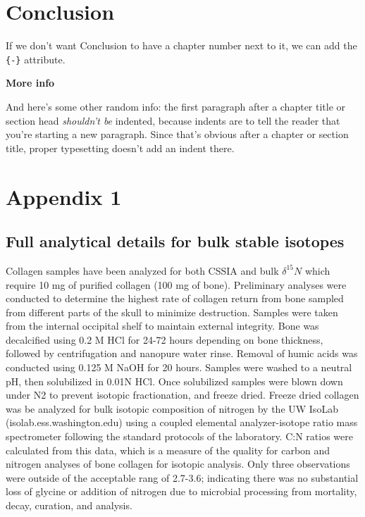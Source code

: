 \documentclass [11pt, proquest] {uwthesis}[2015/03/03]
\begin{document}
\chapter*{Conclusion}\label{conclusion}

If we don't want Conclusion to have a chapter number next to it, we can
add the \texttt{\{-\}} attribute.

\textbf{More info}

And here's some other random info: the first paragraph after a chapter
title or section head \emph{shouldn't be} indented, because indents are
to tell the reader that you're starting a new paragraph. Since that's
obvious after a chapter or section title, proper typesetting doesn't add
an indent there.

\appendix

\chapter{Appendix 1}\label{appendix-1}

\section{Full analytical details for bulk stable
isotopes}\label{full-analytical-details-for-bulk-stable-isotopes}

Collagen samples have been analyzed for both CSSIA and bulk
\(\delta^{15}N\) which require 10 mg of purified collagen (100 mg of
bone). Preliminary analyses were conducted to determine the highest rate
of collagen return from bone sampled from different parts of the skull
to minimize destruction. Samples were taken from the internal occipital
shelf to maintain external integrity. Bone was decalcified using 0.2 M
HCl for 24-72 hours depending on bone thickness, followed by
centrifugation and nanopure water rinse. Removal of humic acids was
conducted using 0.125 M NaOH for 20 hours. Samples were washed to a
neutral pH, then solubilized in 0.01N HCl. Once solubilized samples were
blown down under N2 to prevent isotopic fractionation, and freeze dried.
Freeze dried collagen was be analyzed for bulk isotopic composition of
nitrogen by the UW IsoLab (isolab.ess.washington.edu) using a coupled
elemental analyzer-isotope ratio mass spectrometer following the
standard protocols of the laboratory. C:N ratios were calculated from
this data, which is a measure of the quality for carbon and nitrogen
analyses of bone collagen for isotopic analysis. Only three observations
were outside of the acceptable rang of 2.7-3.6; indicating there was no
substantial loss of glycine or addition of nitrogen due to microbial
processing from mortality, decay, curation, and analysis.
\end{document}
